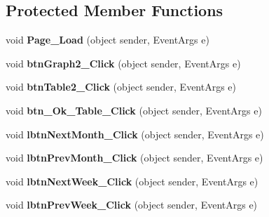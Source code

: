 \subsection*{Protected Member Functions}
\begin{DoxyCompactItemize}
\item 
\hypertarget{classusertrackmyhealth__fertility_aab23037a7ddc884172f9a371e9808bef}{void {\bfseries Page\-\_\-\-Load} (object sender, Event\-Args e)}\label{classusertrackmyhealth__fertility_aab23037a7ddc884172f9a371e9808bef}

\item 
\hypertarget{classusertrackmyhealth__fertility_aff36221b945210c7b7cacee577559495}{void {\bfseries btn\-Graph2\-\_\-\-Click} (object sender, Event\-Args e)}\label{classusertrackmyhealth__fertility_aff36221b945210c7b7cacee577559495}

\item 
\hypertarget{classusertrackmyhealth__fertility_ab420f5c76773453ae8d0d9f342ee5ab4}{void {\bfseries btn\-Table2\-\_\-\-Click} (object sender, Event\-Args e)}\label{classusertrackmyhealth__fertility_ab420f5c76773453ae8d0d9f342ee5ab4}

\item 
\hypertarget{classusertrackmyhealth__fertility_a0bb84095ebb7031a41e2d8efa07eea85}{void {\bfseries btn\-\_\-\-Ok\-\_\-\-Table\-\_\-\-Click} (object sender, Event\-Args e)}\label{classusertrackmyhealth__fertility_a0bb84095ebb7031a41e2d8efa07eea85}

\item 
\hypertarget{classusertrackmyhealth__fertility_a47d0ce37ca73196a50111a3b562fc7d9}{void {\bfseries lbtn\-Next\-Month\-\_\-\-Click} (object sender, Event\-Args e)}\label{classusertrackmyhealth__fertility_a47d0ce37ca73196a50111a3b562fc7d9}

\item 
\hypertarget{classusertrackmyhealth__fertility_ab6f5474f9080ee362e3dbee928bd6769}{void {\bfseries lbtn\-Prev\-Month\-\_\-\-Click} (object sender, Event\-Args e)}\label{classusertrackmyhealth__fertility_ab6f5474f9080ee362e3dbee928bd6769}

\item 
\hypertarget{classusertrackmyhealth__fertility_aca309a18376965c70ee0f4d0f85556a5}{void {\bfseries lbtn\-Next\-Week\-\_\-\-Click} (object sender, Event\-Args e)}\label{classusertrackmyhealth__fertility_aca309a18376965c70ee0f4d0f85556a5}

\item 
\hypertarget{classusertrackmyhealth__fertility_ab7f4c22f74c2d3f3ecf67ec80b01543a}{void {\bfseries lbtn\-Prev\-Week\-\_\-\-Click} (object sender, Event\-Args e)}\label{classusertrackmyhealth__fertility_ab7f4c22f74c2d3f3ecf67ec80b01543a}


\end{DoxyCompactItemize}
